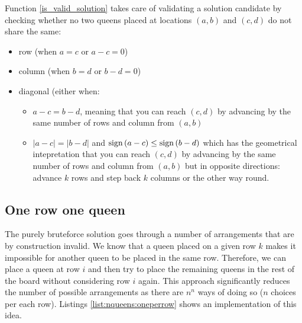 Function \ref{is_valid_solution} takes care of validating a solution candidate by checking whether
no two queens placed at locations $(a,b)$ and $(c,d)$ do not share the same:
\begin{itemize}
	\item row (when $a = c$  or $a-c=0$)
	\item column (when $b = d$  or $b-d=0$) 
	\item diagonal (either when:
	\begin{itemize}
		\item $a-c = b-d$, meaning that you can reach $(c,d)$ by advancing by the same number of
		rows and column from $(a,b)$ 
		\item $|a-c| = |b-d|$ and $\operatorname{sign}{(a-c)} \leq \operatorname{sign}{(b-d)}$  which has the geometrical
		intepretation that you can  reach $(c,d)$ by advancing by the same number of rows and column
		from $(a,b)$ but in opposite directions: advance $k$ rows and step back $k$ columns or the
		other way round.
	\end{itemize} 
\end{itemize}



\subsection{One row one queen}
\label{nqueens:sec:onerowonequeen}
The purely bruteforce solution goes through a number of arrangements that are by construction invalid. 
We know that a queen placed on a given row $k$ makes it impossible for another queen to
be placed in the same row. 
Therefore, we can place a queen at row $i$ and then try to place the remaining queens in the rest of the board without considering row $i$ again. 
This approach significantly reduces the number of possible arrangements as there are $n^n$ ways of doing so ($n$ choices per each row).
Listings \ref{list:nqueens:oneperrow} shows an implementation of this idea.




